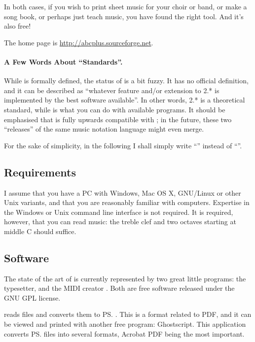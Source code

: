 \documentclass[a4paper,fullpage,12pt]{book}
\begin{document}
In both cases, if you wish to print sheet music for your choir or
band, or make a song book, or perhaps just teach music, you have found
the right tool. And it's also free!

The \ABCPLUS{} home page is \url{http://abcplus.sourceforge.net}.

\paragraph{A Few Words About ``Standards''.}

While \ABC{} is formally defined, the status of \ABCPLUS{} is a bit
fuzzy. It has no official definition, and it can be described as
``whatever feature and/or extension to \ABC{} 2.* is implemented by
the best software available''. In other words, \ABC{} 2.* is a
theoretical standard, while \ABCPLUS{} is what you can do with
available programs. It should be emphasised that \ABCPLUS{} is fully
upwards compatible with \ABC; in the future, these two ``releases'' of
the same music notation language might even merge.

For the sake of simplicity, in the following I shall simply write
``\ABC{}'' instead of ``\ABCPLUS{}''.



\subsection{Requirements}

I assume that you have a PC with Windows, Mac OS X, GNU/Linux or other
Unix variants, and that you are reasonably familiar with computers.
Expertise in the Windows or Unix command line interface is not
required. It is required, however, that you can read music: the treble
clef and two octaves starting at middle C should suffice.


\subsection{Software}

The state of the art of \ABC{} is currently represented by two great
little programs: the \abcm{} typesetter, and the MIDI creator \abcmid.
Both are free software released under the GNU GPL license.

\abcm{} reads \ABC{} files and converts them to \ps. This is a format
related to PDF, and it can be viewed and printed with another free
program: Ghostscript. This application converts \ps{} files into
several formats, Acrobat PDF being the most important.
\end{document}
